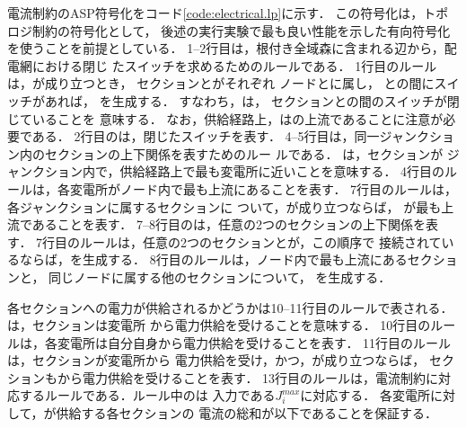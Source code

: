 電流制約のASP符号化をコード\ref{code:electrical.lp}に示す．
この符号化は，トポロジ制約の符号化として，
後述の実行実験で最も良い性能を示した有向符号化を使うことを前提としている．
% 
1--2行目は，根付き全域森に含まれる辺から，配電網における閉じ
たスイッチを求めるためのルールである．
1行目のルールは，が成り立つとき，
セクションとがそれぞれ
ノードとに属し，
との間にスイッチがあれば，
を生成する．
すなわち，は，
セクションとの間のスイッチが閉じていることを
意味する．
なお，供給経路上，はの上流であることに注意が必要である．
2行目のは，閉じたスイッチを表す．
%
4--5行目は，同一ジャンクション内のセクションの上下関係を表すためのルー
ルである．
は，セクションが
ジャンクション内で，供給経路上で最も変電所に近いことを意味する．
4行目のルールは，各変電所がノード内で最も上流にあることを表す．
7行目のルールは，各ジャンクションに属するセクションに
ついて，が成り立つならば，
が最も上流であることを表す．
%
7--8行目のは，任意の2つのセクションの上下関係を表す．
7行目のルールは，任意の2つのセクションとが，この順序で
接続されているならば，を生成する．
8行目のルールは，ノード内で最も上流にあるセクションと，
同じノードに属する他のセクションについて，
を生成する．

各セクションへの電力が供給されるかどうかは10--11行目のルールで表される．
は，セクションは変電所
から電力供給を受けることを意味する．
10行目のルールは，各変電所は自分自身から電力供給を受けることを表す．
11行目のルールは，セクションが変電所から
電力供給を受け，かつ，が成り立つならば，
セクションもから電力供給を受けることを表す．
%
13行目のルールは，電流制約に対応するルールである．ルール中のは
入力である$J_i^{max}$に対応する．
各変電所に対して，が供給する各セクションの
電流の総和が以下であることを保証する．

